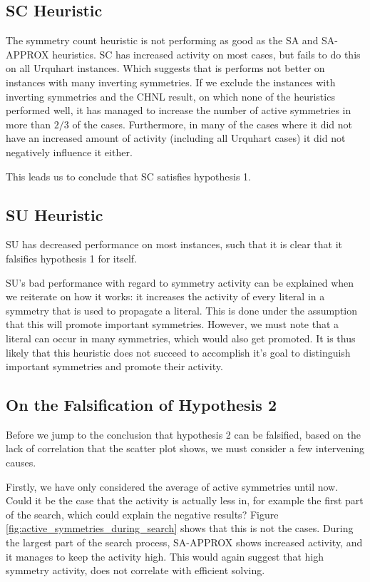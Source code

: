 \subsection{SC Heuristic}
	The symmetry count heuristic is not performing as good as the SA and SA-APPROX heuristics.
	SC has increased activity on most cases, but fails to do this on all Urquhart instances.
	Which suggests that is performs not better on instances with many inverting symmetries.
	If we exclude the instances with inverting symmetries and the CHNL result, on which none of the
	heuristics performed well, it has managed to increase the number of active symmetries in more
	than $2/3$ of the cases.
	Furthermore, in many of the cases where it did not have an increased amount of activity
	(including all Urquhart cases) it did not negatively influence it either.

	This leads us to conclude that SC satisfies hypothesis 1.

\subsection{SU Heuristic}
	SU has decreased performance on most instances, such that it is clear that it falsifies
	hypothesis 1 for itself.

	SU's bad performance with regard to symmetry activity can be explained when we reiterate on
	how it works: it increases the activity of every literal in a symmetry that is used to propagate
	a literal.
	This is done under the assumption that this will promote important symmetries.
	However, we must note that a literal can occur in many symmetries, which would also get
	promoted.
	It is thus likely that this heuristic does not succeed to accomplish it's goal to distinguish
	important symmetries and promote their activity.

\subsection{On the Falsification of Hypothesis 2}
\label{ssec:falsification_hyp_2}

	Before we jump to the conclusion that hypothesis 2 can be falsified, based on the lack of
	correlation that the scatter plot shows, we must consider a few intervening causes.

	Firstly, we have only considered the average of active symmetries until now.
	Could it be the case that the activity is actually less in, for example the first part of the
	search, which could explain the negative results?
	Figure \ref{fig:active_symmetries_during_search} shows that this is not the cases.
	During the largest part of the search process, SA-APPROX shows increased activity, and it
	manages to keep the activity high.
	This would again suggest that high symmetry activity, does not correlate with efficient solving.

